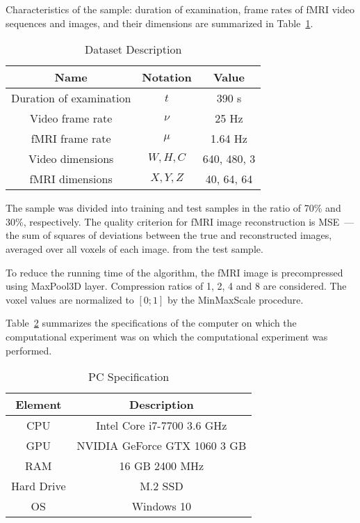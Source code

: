 \documentclass{article}
\begin{document}
Characteristics of the sample: duration of examination,
frame rates of fMRI video sequences and images, and their dimensions are summarized in Table~\ref{table:sample}.

\begin{table}[h!]
	\centering
	\caption{Dataset Description}
	\begin{tabular}{|c|c|c|}
		\hline
		Name                       & Notation & Value             \\
		\hline \hline
		Duration of examination & $t$         & 390 s                \\ \hline
		Video frame rate           & $\nu$       & 25 Hz   \\ \hline
		fMRI frame rate           & $\mu$       & 1.64 Hz \\ \hline
		Video dimensions        & $W, H, C$   & 640, 480, 3          \\ \hline
		fMRI dimensions             & $X, Y, Z$   & 40, 64, 64           \\ \hline
	\end{tabular}
	\label{table:sample}
\end{table}

The sample was divided into training and test samples in the ratio of 70\% and 30\%, respectively.
The quality criterion for fMRI image reconstruction is MSE~--- the sum of squares of deviations
between the true and reconstructed images, averaged over all voxels of each image.
from the test sample.

To reduce the running time of the algorithm, the fMRI image is precompressed
using MaxPool3D layer. Compression ratios of 1, 2, 4 and 8 are considered.
The voxel values are normalized to $[0; 1]$ by the MinMaxScale procedure.

Table~\ref{table:pc} summarizes the specifications of the computer on which the computational experiment was
on which the computational experiment was performed.

\begin{table}[h!]
	\centering
	\caption{PC Specification}
	\begin{tabular}{|c|c|}
		\hline
		Element & Description \\
		\hline \hline
		CPU & Intel Core i7-7700 3.6 GHz \\ \hline
		GPU & NVIDIA GeForce GTX 1060 3 GB \\ \hline
		RAM & 16 GB 2400 MHz \\ \hline
		Hard Drive & M.2 SSD \\ \hline
		OS & Windows 10 \\ \hline
	\end{tabular}
	\label{table:pc}
\end{table}
\end{document}
